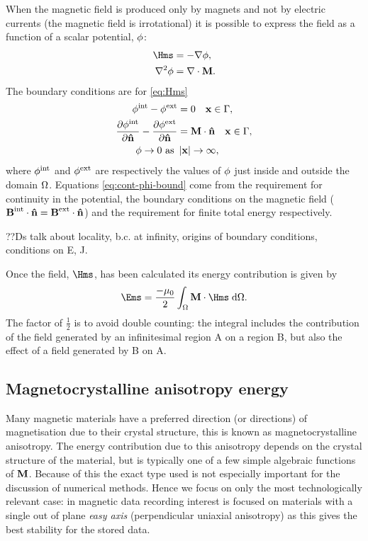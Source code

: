 When the magnetic field is produced only by magnets and not by electric currents (\ie the magnetic field is irrotational) it is possible to express the field as a function of a scalar potential, $\phi$: %
\begin{equation}
  \begin{aligned}
    \label{eq:Hms}
    \Hms &= - \grad \phim, \\
    \lap \phim &= \div \Mv.
  \end{aligned}
\end{equation}
The boundary conditions are for \cref{eq:Hms}
\begin{equation}
  \begin{aligned}
    \label{eq:cont-phi-bound}
    \phi^{\mathrm{int}} - \phi^{\mathrm{ext}} &= 0 \quad \boldsymbol{\mathrm{x}} \in {\Gamma}, \\
    \frac{\partial \phi^{\mathrm{int}}}{\partial \boldsymbol{\mathrm{\hat{n}}}} - \frac{\partial \phi^{\mathrm{ext}}}{\partial \boldsymbol{\mathrm{\hat{n}}}} &= \boldsymbol{\mathrm{M}} \cdot \boldsymbol{\mathrm{\hat{n}}} \quad \boldsymbol{\mathrm{x}} \in {\Gamma}, \\
    \phi \rightarrow 0 \text{ as } &\left|{\boldsymbol{\mathrm{x}}} \right| \rightarrow \infty,
  \end{aligned}
\end{equation}
where $\phi^{\mathrm{int}}$ and $\phi^{\mathrm{ext}}$ are respectively the values of $\phi$ just inside and outside the domain $\Omega$.
Equations \eqref{eq:cont-phi-bound} come from the requirement for continuity in the potential, the boundary conditions on the magnetic field ($\boldsymbol{\mathrm{B}}^\text{int} \cdot \boldsymbol{\mathrm{\hat{n}}} = \boldsymbol{\mathrm{B}}^\text{ext} \cdot \boldsymbol{\mathrm{\hat{n}}}$) and the requirement for finite total energy respectively.

??Ds talk about locality, b.c. at infinity, origins of boundary conditions, conditions on E, J.



Once the field, $\Hms$, has been calculated its energy contribution is given by
\begin{equation}
  \label{eq:41}
  \Ems =  \frac{-\mu_0}{2} \int_{\magd} \Mv \cdot \Hms \d \magd.
\end{equation}
The factor of $\frac{1}{2}$ is to avoid double counting: the integral includes the contribution of the field generated by an infinitesimal region A on a region B, but also the effect of a field generated by B on A.

\subsection{Magnetocrystalline anisotropy energy}
\label{sec:magn-anis}

Many magnetic materials have a preferred direction (or directions) of magnetisation due to their crystal structure, this is known as magnetocrystalline anisotropy.
The energy contribution due to this anisotropy depends on the crystal structure of the material, but is typically one of a few simple algebraic functions of $\boldsymbol{\mathrm{M}}$.
Because of this the exact type used is not especially important for the discussion of numerical methods.
Hence we focus on only the most technologically relevant case: in magnetic data recording interest is focused on materials with a single out of plane \emph{easy axis} (perpendicular uniaxial anisotropy) as this gives the best stability for the stored data.

